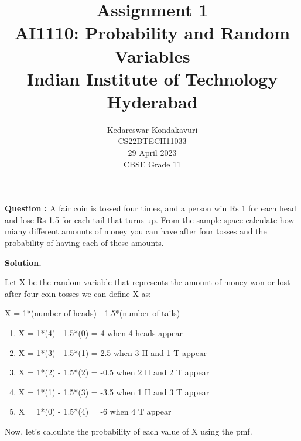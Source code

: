 \documentclass[journal,12pt,twocolumn]{IEEEtran}
\begin{document}
\let\vec\mathbf

\title{Assignment 1 \\ \Large AI1110: Probability and Random Variables \\ \large Indian Institute of Technology Hyderabad}
\author{Kedareswar Kondakavuri \\ \normalsize CS22BTECH11033 \\ \vspace*{20pt} \normalsize  29 April 2023 \\ \vspace*{20pt} \Large CBSE Grade 11}

	\maketitle
	
	\textbf{Question :}
	A fair coin is tossed four times, and a person win  Rs 1 for each head and lose
	Rs 1.5 for each tail that turns up.
	From the sample space calculate how miany different amounts of money you can
        have after four tosses and the probability of having each of these amounts.
       
	\textbf{Solution.}

        Let X be the random variable that represents the amount of money won or lost after four coin tosses we can define X as:

	X = 1*(number of heads) - 1.5*(number of tails)
	\\
	\begin{enumerate}[label=(\roman*)]
		
			\item X = 1*(4) - 1.5*(0) = 4   when 4 heads appear
			\item X = 1*(3) - 1.5*(1) = 2.5  when 3 H and 1 T appear
			\item X = 1*(2) - 1.5*(2) = -0.5 when 2 H and 2 T appear
			\item X = 1*(1) - 1.5*(3) = -3.5 when 1 H and 3 T appear
			\item X = 1*(0) - 1.5*(4) = -6   when 4 T appear


	\end{enumerate}

	Now, let's calculate the probability of each value of X using the pmf. 
	\\
	
\end{document}
